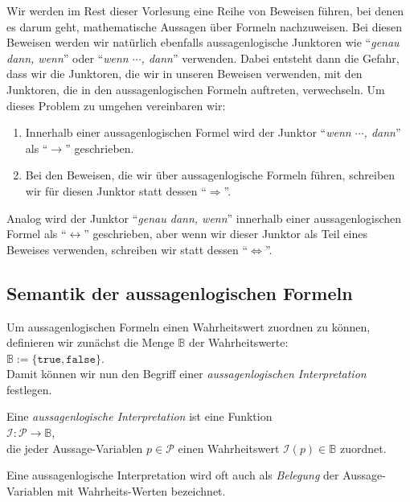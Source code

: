 \remark
Wir werden im Rest dieser Vorlesung eine Reihe von Beweisen f\"{u}hren, bei denen es darum geht,
mathematische Aussagen \"{u}ber Formeln nachzuweisen.  Bei diesen Beweisen werden wir nat\"{u}rlich
ebenfalls aussagenlogische Junktoren wie ``\emph{genau dann, wenn}'' oder 
``\emph{wenn $\cdots$,  dann}'' verwenden.  Dabei entsteht dann die Gefahr, dass wir die Junktoren,
die wir in unseren Beweisen verwenden, mit den Junktoren, die in den aussagenlogischen Formeln
auftreten, verwechseln.  Um dieses Problem zu umgehen vereinbaren wir:
\begin{enumerate}
\item Innerhalb einer aussagenlogischen Formel wird der Junktor  
      ``\emph{wenn $\cdots$,  dann}'' als ``$\rightarrow$''  geschrieben.
\item Bei den Beweisen, die wir \"{u}ber aussagenlogische Formeln f\"{u}hren, schreiben wir f\"{u}r diesen
      Junktor statt dessen ``$\Rightarrow$''.
\end{enumerate}
Analog wird der Junktor ``\emph{genau dann, wenn}'' innerhalb einer aussagenlogischen Formel als
``$\leftrightarrow$'' geschrieben, aber wenn wir dieser Junktor als Teil eines Beweises verwenden,
schreiben wir statt dessen ``$\Leftrightarrow$''. \eox

\subsection{Semantik der aussagenlogischen Formeln}
Um aussagenlogischen Formeln einen Wahrheitswert zuordnen zu k\"{o}nnen, definieren wir
zun\"{a}chst die Menge $\mathbb{B}$ der Wahrheitswerte:  \\[0.2cm] 
\hspace*{1.3cm} $\mathbb{B} := \{ \mathtt{true}, \mathtt{false} \}$. \\[0.2cm]
Damit k\"{o}nnen wir nun
den Begriff einer \emph{aussagenlogischen Interpretation} festlegen.

\begin{Definition}
  Eine \emph{aussagenlogische Interpretation} ist eine Funktion \\[0.2cm]
  \hspace*{1.3cm} $\mathcal{I}:\mathcal{P} \rightarrow \mathbb{B}$, \\[0.2cm]
  die jeder Aussage-Variablen $p\in \mathcal{P}$ einen Wahrheitswert $\mathcal{I}(p) \in \mathbb{B}$ zuordnet.
  \eox
\end{Definition}
Eine aussagenlogische Interpretation wird oft auch als \emph{Belegung} der
Aussage-Variablen mit Wahr\-heits-Werten bezeichnet.  


